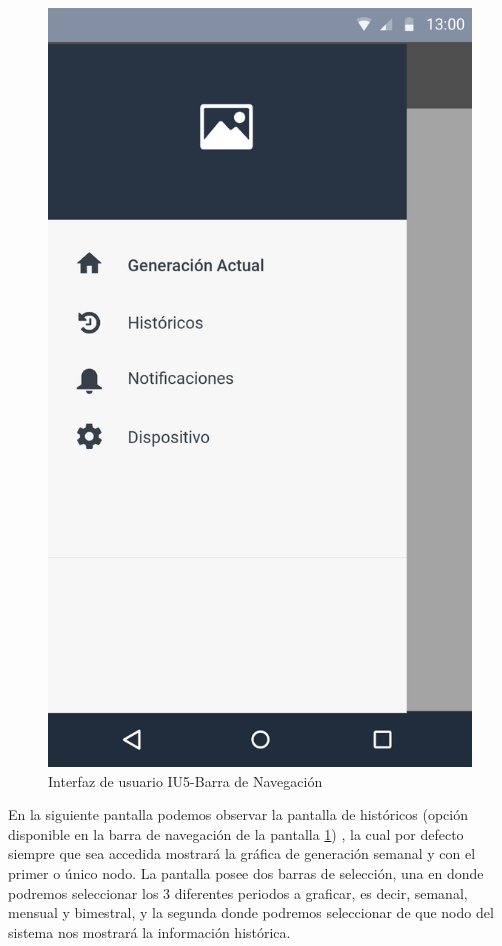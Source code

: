 \begin{figure}[H]
	\centering
	\includegraphics[scale=0.70]{Capitulo4/software/submodulos/images/navegacion.png}
	\caption{Interfaz de usuario IU5-Barra de Navegación}
	\label{fig:Barra de navegacion}
\end{figure}

En la siguiente pantalla podemos observar la pantalla de históricos (opción disponible en la barra de navegación de la pantalla \ref{fig:Barra de navegacion}) , la cual por defecto siempre que sea accedida mostrará la gráfica de generación semanal y con el primer o único nodo. La pantalla posee dos barras de selección, una en donde podremos seleccionar los 3 diferentes periodos a graficar, es decir, semanal, mensual y bimestral, y la segunda donde podremos seleccionar de que nodo del sistema nos mostrará la información histórica. 

